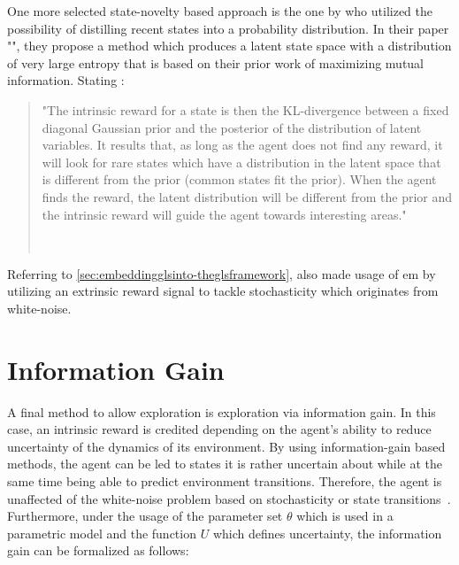 \documentclass[draft,final]{vutinfth} %
\newcommand{\p}[1]{see p. #1}
\begin{document}
    One more selected state-novelty based approach is the one by \citet{kim_curiosity-bottleneck_2019-1} who utilized the possibility of distilling recent states into a probability distribution.
    In their paper "", they propose a method which produces a latent state space with a distribution of very large entropy that is based on their prior work of maximizing mutual information.
    Stating \citeauthor{aubret_survey_2019}:

    \begin{quote}
        "The intrinsic reward for a state is then the KL-divergence between a fixed diagonal Gaussian prior and the posterior of the distribution of latent variables.
        It results that, as long as the agent does not find any reward, it will look for rare states which have a distribution in the latent space that is different from the prior (common states fit the prior).
        When the agent finds the reward, the latent distribution will be different from the prior and the intrinsic reward will guide the agent towards interesting areas."

        \hfill~\cite[\p{12}]{aubret_survey_2019}
    \end{quote}

    Referring to \autoref{sec:embeddingglsinto-theglsframework}, \citet{kim_curiosity-bottleneck_2019-1} also made usage of \gls{em} by utilizing an extrinsic reward signal to tackle stochasticity which originates from white-noise.


    \section{Information Gain}\label{sec:information-gain}

    A final method to allow exploration is exploration via information gain.
    In this case, an intrinsic reward is credited depending on the agent's ability to reduce uncertainty of the dynamics of its environment.
    By using information-gain based methods, the agent can be led to states it is rather uncertain about while at the same time being able to predict environment transitions.
    Therefore, the agent is unaffected of the white-noise problem based on stochasticity or state transitions~\citep{aubret_survey_2019}.
    Furthermore, under the usage of the parameter set $\theta$ which is used in a parametric model and the function $U$ which defines uncertainty, the information gain can be formalized as follows:
\end{document}
